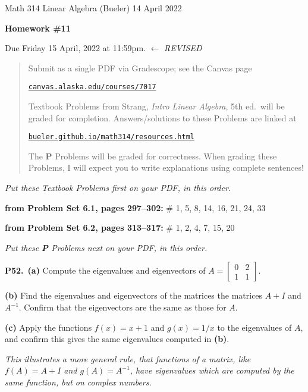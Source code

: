 \documentclass[12pt]{amsart}
\newcommand{\ds}{\displaystyle}
\newcommand{\prob}[1]{\bigskip\noindent\textbf{#1.}\quad }
\newcommand{\probset}[2]{\bigskip\noindent\textbf{from Problem Set #1, pages #2:}\quad }
\newcommand{\epart}[1]{\medskip\noindent\textbf{(#1)}\quad }
\newcommand{\ppart}[1]{\,\textbf{(#1)}\quad }
\begin{document}
\scriptsize \noindent Math 314 Linear Algebra (Bueler) \hfill 14 April 2022
\normalsize\medskip

\Large
\centerline{\textbf{Homework \#11}}

\bigskip
\large
\centerline{Due Friday 15 April, 2022 at 11:59pm. \quad $\gets$ \emph{REVISED}}

\normalsize
\bigskip
\begin{quote}
\medskip
\noindent Submit as a single PDF via Gradescope; see the Canvas page

\href{https://canvas.alaska.edu/courses/7017}{\texttt{canvas.alaska.edu/courses/7017}}

\noindent Textbook Problems from Strang, \emph{Intro Linear Algebra}, 5th ed.~will be graded for completion.  Answers/solutions to these Problems are linked at

\href{https://bueler.github.io/math314/resources.html}{\texttt{bueler.github.io/math314/resources.html}}

\noindent The \textbf{P} Problems will be graded for correctness.  When grading these Problems, I will expect you to write explanations using complete sentences!
\end{quote}
\medskip

\thispagestyle{empty}

\noindent \hrulefill

\noindent \emph{Put these Textbook Problems first on your PDF, in this order.}

\probset{6.1}{297--302} \# 1, 5, 8, 14, 16, 21, 24, 33

\probset{6.2}{313--317} \# 1, 2, 4, 7, 15, 20

\bigskip
\noindent \hrulefill

\noindent \emph{Put these \textbf{P} Problems next on your PDF, in this order.}

\prob{P52}  \ppart{a}  Compute the eigenvalues and eigenvectors of $\ds A = \begin{bmatrix} 0 & 2 \\ 1 & 1 \end{bmatrix}$.

\epart{b}  Find the eigenvalues and eigenvectors of the matrices the matrices $A+I$ and $A^{-1}$.  Confirm that the eigenvectors are the same as those for $A$.

\epart{c}  Apply the functions $f(x) = x+1$ and $g(x) = 1/x$ to the eigenvalues of $A$, and confirm this gives the same eigenvalues computed in \textbf{(b)}.

\medskip
\noindent \emph{This illustrates a more general rule, that functions of a matrix, like $f(A)=A+I$ and $g(A)=A^{-1}$, have eigenvalues which are computed by the same function, but on complex numbers.}
\end{document}
